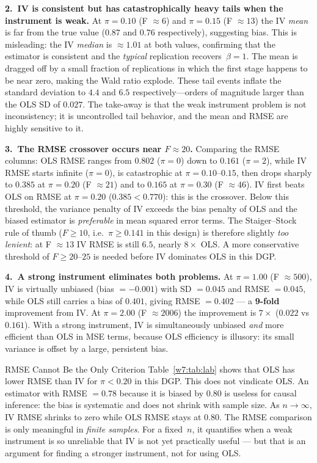 \documentclass[master.tex]{subfiles}
\begin{document}
\medskip
\noindent\textbf{2.\ IV is consistent but has catastrophically heavy
tails when the instrument is weak.}
At $\pi = 0.10$ (F $\approx 6$) and $\pi = 0.15$ (F $\approx 13$)
the IV \emph{mean} is far from the true value ($0.87$ and $0.76$
respectively), suggesting bias.  This is misleading: the IV
\emph{median} is $\approx 1.01$ at both values, confirming that
the estimator is consistent and the \emph{typical} replication
recovers~$\beta = 1$.  The mean is dragged off by a small
fraction of replications in which the first stage happens to be
near zero, making the Wald ratio explode.  These tail events
inflate the standard deviation to $4.4$ and $6.5$
respectively---orders of magnitude larger than the OLS SD of
$0.027$.  The take-away is that the weak instrument problem is
not inconsistency; it is uncontrolled tail behavior, and the
mean and RMSE are highly sensitive to it.

\medskip
\noindent\textbf{3.\ The RMSE crossover occurs near $F \approx 20$.}
Comparing the RMSE columns: OLS RMSE ranges from $0.802$
($\pi = 0$) down to $0.161$ ($\pi = 2$), while IV RMSE starts
infinite ($\pi = 0$), is catastrophic at $\pi = 0.10$--$0.15$,
then drops sharply to $0.385$ at $\pi = 0.20$ (F $\approx 21$)
and to $0.165$ at $\pi = 0.30$ (F $\approx 46$).  IV first beats
OLS on RMSE at $\pi = 0.20$ ($0.385 < 0.770$): this is the
crossover.  Below this threshold, the variance penalty of IV
exceeds the bias penalty of OLS and the biased estimator is
\emph{preferable} in mean squared error terms.
The Staiger--Stock rule of thumb ($F \geq 10$, i.e.\
$\pi \geq 0.141$ in this design) is therefore slightly
\emph{too lenient}: at F $\approx 13$ IV RMSE is still $6.5$,
nearly $8\times$ OLS.  A more conservative threshold of
$F \geq 20$--$25$ is needed before IV dominates OLS in this DGP.

\medskip
\noindent\textbf{4.\ A strong instrument eliminates both problems.}
At $\pi = 1.00$ (F $\approx 500$), IV is virtually unbiased
(bias $= -0.001$) with SD $= 0.045$ and RMSE $= 0.045$,
while OLS still carries a bias of $0.401$, giving RMSE $= 0.402$
--- a \textbf{9-fold} improvement from IV.  At $\pi = 2.00$
(F $\approx 2006$) the improvement is $7\times$ ($0.022$ vs
$0.161$).  With a strong instrument, IV is simultaneously unbiased
\emph{and} more efficient than OLS in MSE terms, because OLS
efficiency is illusory: its small variance is offset by a large,
persistent bias.

\begin{warn}{RMSE Cannot Be the Only Criterion}
Table~\ref{w7:tab:lab} shows that OLS has lower RMSE than IV
for $\pi < 0.20$ in this DGP.  This does not vindicate OLS.
An estimator with RMSE $= 0.78$ because it is biased by $0.80$
is useless for causal inference: the bias is systematic and
does not shrink with sample size.  As $n \to \infty$, IV RMSE
shrinks to zero while OLS RMSE stays at $0.80$.  The RMSE
comparison is only meaningful in \emph{finite samples}.  For
a fixed~$n$, it quantifies when a weak instrument is so
unreliable that IV is not yet practically useful --- but that
is an argument for finding a stronger instrument, not for
using OLS.
\end{warn}
\end{document}

